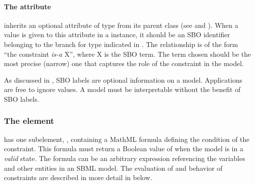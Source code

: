 \label{sec:constraint-id}



\paragraph{The  attribute}
\label{sec:constraint-sboterm}

\Constraint inherits an optional 
attribute of type  from its parent
class \SBase (see 
and ).  When a value is given to this
attribute in a  \Constraint instance, it should be an
SBO identifier belonging to the branch for type  \Constraint
indicated in .  The relationship is
of the form ``the constraint \emph{is-a} X'', where X is
the SBO term.  The term chosen should be the most precise (narrow)
one that captures the role of the constraint in the model.

As discussed in , SBO labels are optional
information on a model.  Applications are free to ignore
 values.  A model must be interpretable without the
benefit of SBO labels.


\subsubsection{The  element}

\Constraint has one subelement, ,
containing a MathML formula defining the condition of the
constraint.  This formula must return a Boolean value of
 when the model is in a \emph{valid} state.  The formula
can be an arbitrary expression referencing the variables and other
entities in an SBML model.  The evaluation of  and
behavior of constraints are described in more detail in
 below.


